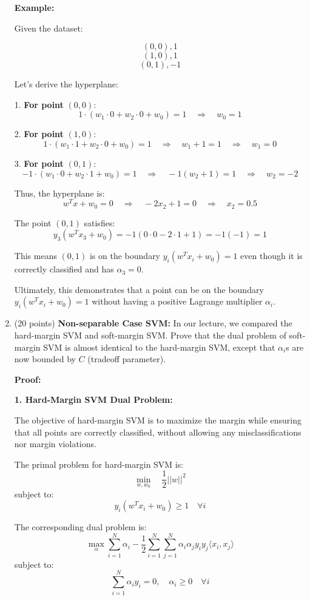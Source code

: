 \documentclass[11pt]{article}
\begin{document}
\begin{enumerate}
\textbf{Example:}

Given the dataset:

\[ (0,0), 1 \]
\[ (1,0), 1 \]
\[ (0,1), -1 \]

Let's derive the hyperplane:

1. \textbf{For point} \( (0,0) \):
\[
1 \cdot (w_1 \cdot 0 + w_2 \cdot 0 + w_0) = 1 \quad \Rightarrow \quad w_0 = 1
\]

2. \textbf{For point} \( (1,0) \):
\[
1 \cdot (w_1 \cdot 1 + w_2 \cdot 0 + w_0) = 1 \quad \Rightarrow \quad w_1 + 1 = 1 \quad \Rightarrow \quad w_1 = 0
\]

3. \textbf{For point }\( (0,1) \):
\[
-1 \cdot (w_1 \cdot 0 + w_2 \cdot 1 + w_0) = 1 \quad \Rightarrow \quad -1(w_2 + 1) = 1 \quad \Rightarrow \quad w_2 = -2
\]

Thus, the hyperplane is:
\[
w^T x + w_0 = 0 \quad \Rightarrow \quad -2x_2 + 1 = 0 \quad \Rightarrow \quad x_2 = 0.5
\]

The point \( (0,1) \) satisfies:
\[
y_3(w^T x_3 + w_0) = -1(0 \cdot 0 - 2 \cdot 1 + 1) = -1(-1) = 1
\]

This means \( (0,1) \) is on the boundary \( y_i(w^T x_i + w_0) = 1 \) even though it is correctly classified and has \( \alpha_3 = 0 \).

Ultimately, this demonstrates that a point can be on the boundary \( y_i(w^T x_i + w_0) = 1 \) without having a positive Lagrange multiplier \( \alpha_i \).

\item (20 points) \textbf{Non-separable Case SVM:} In our lecture, we compared the hard-margin SVM and soft-margin SVM.
Prove that the dual problem of soft-margin SVM is almost
identical to the hard-margin SVM, except that $\alpha_i$s are
now bounded by $C$ (tradeoff parameter).


\textbf{Proof:}

\textbf{1. Hard-Margin SVM Dual Problem:}

The objective of hard-margin SVM is to maximize the margin while ensuring that all points are correctly classified, without allowing any misclassifications nor margin violations.

The primal problem for hard-margin SVM is:
\[
\min_{w, w_0} \quad \frac{1}{2} ||w||^2
\]
subject to:
\[
y_i(w^T x_i + w_0) \geq 1 \quad \forall i
\]

The corresponding dual problem is:
\[
\max_{\alpha} \sum_{i=1}^N \alpha_i - \frac{1}{2} \sum_{i=1}^N \sum_{j=1}^N \alpha_i \alpha_j y_i y_j \langle x_i, x_j \rangle
\]
subject to:
\[
\sum_{i=1}^N \alpha_i y_i = 0, \quad \alpha_i \geq 0 \quad \forall i
\]


\end{enumerate}
\end{document}
